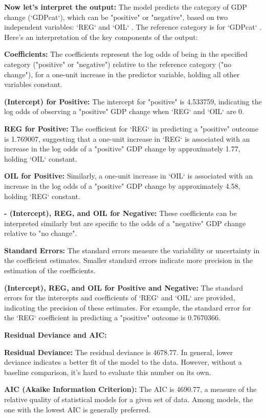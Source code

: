 \documentclass[12pt,letterpaper]{article}
\begin{document}
\begin{enumerate}
\newpage
\textbf{Now let's interpret the output:}
The model predicts the category of GDP change (`GDPcat`), which can be "positive" or "negative", based on two independent variables: `REG` and `OIL` . The reference category is for `GDPcat` . Here's an interpretation of the key components of the output:

\textbf{Coefficients:}
The coefficients represent the log odds of being in the specified category ("positive" or "negative") relative to the reference category ("no change"), for a one-unit increase in the predictor variable, holding all other variables constant.

\textbf{(Intercept) for Positive:} The intercept for "positive" is 4.533759, indicating the log odds of observing a "positive" GDP change when `REG` and `OIL` are 0.

\textbf{REG for Positive: }The coefficient for `REG` in predicting a "positive" outcome is 1.769007, suggesting that a one-unit increase in `REG` is associated with an increase in the log odds of a "positive" GDP change by approximately 1.77, holding `OIL` constant.

\textbf{OIL for Positive:} Similarly, a one-unit increase in `OIL` is associated with an increase in the log odds of a "positive" GDP change by approximately 4.58, holding `REG` constant.

\textbf{- (Intercept), REG, and OIL for Negative: }These coefficients can be interpreted similarly but are specific to the odds of a "negative" GDP change relative to "no change".

\textbf{Standard Errors:}
The standard errors measure the variability or uncertainty in the coefficient estimates. Smaller standard errors indicate more precision in the estimation of the coefficients.

\textbf{(Intercept), REG, and OIL for Positive and Negative: }The standard errors for the intercepts and coefficients of `REG` and `OIL` are provided, indicating the precision of these estimates. For example, the standard error for the `REG` coefficient in predicting a "positive" outcome is 0.7670366.

\textbf{Residual Deviance and AIC:}

\textbf{Residual Deviance: }The residual deviance is 4678.77. In general, lower deviance indicates a better fit of the model to the data. However, without a baseline comparison, it's hard to evaluate this number on its own.

\textbf{AIC (Akaike Information Criterion):} The AIC is 4690.77, a measure of the relative quality of statistical models for a given set of data. Among models, the one with the lowest AIC is generally preferred.


\end{enumerate}
\end{document}
